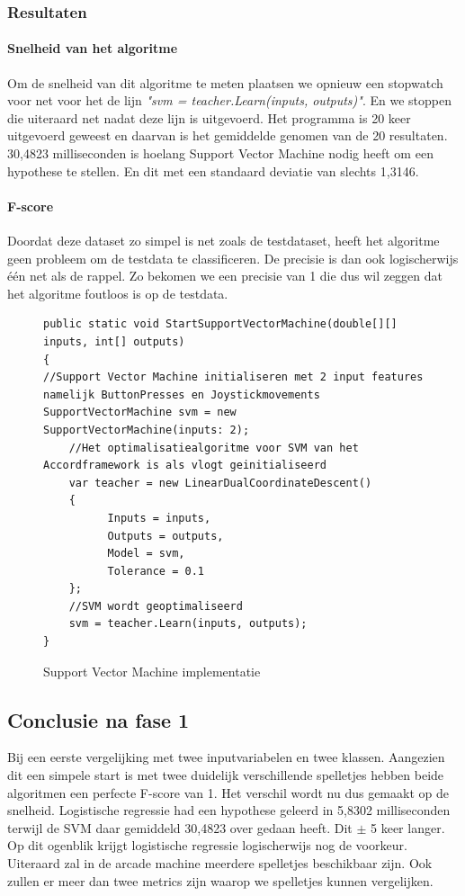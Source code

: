 \subsubsection{Resultaten}
\paragraph{Snelheid van het algoritme} 
Om de snelheid van dit algoritme te meten plaatsen we opnieuw een stopwatch voor net voor het de lijn \textit{"svm = teacher.Learn(inputs, outputs)"}. En we stoppen die uiteraard net nadat deze lijn is uitgevoerd. Het programma is 20 keer uitgevoerd geweest en daarvan is het gemiddelde genomen van de 20 resultaten. 30,4823 milliseconden is hoelang Support Vector Machine nodig heeft om een hypothese te stellen. En dit met een standaard deviatie van slechts 1,3146.

\paragraph{F-score}
Doordat deze dataset zo simpel is net zoals de testdataset, heeft het algoritme geen probleem om de testdata te classificeren. De precisie is dan ook logischerwijs één net als de rappel.
Zo bekomen we een precisie van 1 die dus wil zeggen dat het algoritme foutloos is op de testdata.  



\begin{figure}[]
\renewcommand{\figurename}{Code}
\begin{lstlisting}
public static void StartSupportVectorMachine(double[][] inputs, int[] outputs)
{
//Support Vector Machine initialiseren met 2 input features namelijk ButtonPresses en Joystickmovements
SupportVectorMachine svm = new 			SupportVectorMachine(inputs: 2);
	//Het optimalisatiealgoritme voor SVM van het Accordframework is als vlogt geinitialiseerd
	var teacher = new LinearDualCoordinateDescent()
	{
	      Inputs = inputs,
	      Outputs = outputs,
	      Model = svm,
	      Tolerance = 0.1
	};
	//SVM wordt geoptimaliseerd
	svm = teacher.Learn(inputs, outputs);
}
\end{lstlisting}
\caption{Support Vector Machine implementatie}
\label{code:svmBi}
\end{figure}
\subsection{Conclusie na fase 1}
Bij een eerste vergelijking met twee inputvariabelen en twee klassen. Aangezien dit een simpele start is met twee duidelijk verschillende spelletjes hebben beide algoritmen een perfecte F-score van 1.  Het verschil wordt nu dus gemaakt op de snelheid. Logistische regressie had een hypothese geleerd in 5,8302 milliseconden terwijl de SVM daar gemiddeld 30,4823 over gedaan heeft. Dit $\pm$ 5 keer langer. 
\newline
Op dit ogenblik krijgt logistische regressie logischerwijs nog de voorkeur. Uiteraard zal in de arcade machine meerdere spelletjes beschikbaar zijn. Ook zullen er meer dan twee metrics zijn waarop we spelletjes kunnen vergelijken. 








